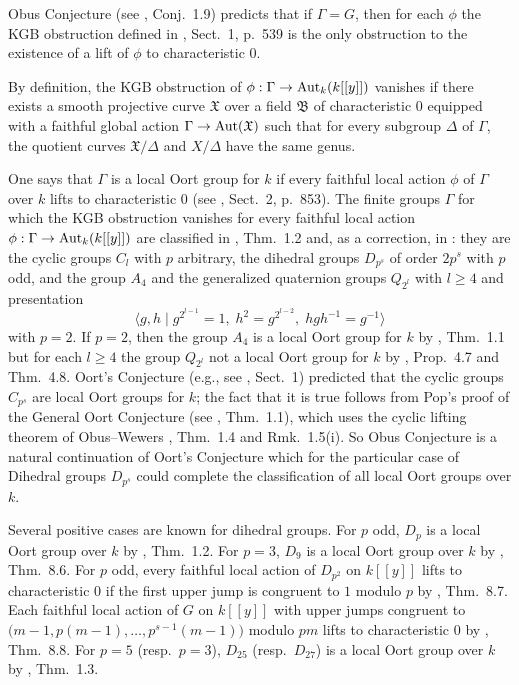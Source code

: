 \documentclass[11pt]{amsart}
\def\Aut{\textup{Aut}}
\begin{document}
Obus Conjecture (see \cite{O3}, Conj.\ 1.9) predicts that if $\Gamma=G$, then for each $\phi$ the KGB obstruction defined in \cite{CGH2}, Sect.\ 1, p.\ 539 is the only obstruction to the existence of a lift of $\phi$ to characteristic $0$. 

By definition, the KGB obstruction of $\phi:\Gamma\rightarrow\Aut_k(k[[y]])$ vanishes if there exists a smooth projective curve $\mathfrak X$ over a field $\mathfrak B$ of characteristic $0$ equipped with a faithful global action $\Gamma\rightarrow\Aut(\mathfrak X)$ such that for every subgroup $\Delta$ of $\Gamma$, the quotient curves $\mathfrak X/\Delta$ and $X/\Delta$ have the same genus.

One says that $\Gamma$ is a local Oort group for $k$ if every faithful local action $\phi$ of $\Gamma$ over $k$ lifts to characteristic $0$ (see \cite{CGH1}, Sect.\ 2, p.\ 853). The finite groups $\Gamma$ for which the KGB obstruction vanishes for every faithful local action $\phi:\Gamma\rightarrow\Aut_k(k[[y]])$ are classified in \cite{CGH2}, Thm.\ 1.2 and, as a correction, in \cite{CGH3}: they are the cyclic groups $C_l$ with $p$ arbitrary, the dihedral groups $D_{p^s}$ of order $2p^s$ with $p$ odd, and the group $A_4$ and the generalized quaternion groups $Q_{2^l}$ with $l\ge 4$ and presentation 
$$\langle g,h\mid g^{2^{l-1}}=1,\; h^2=g^{2^{l-2}},\; hgh^{-1}=g^{-1}\rangle$$ 
with $p=2$. If $p=2$, then the group $A_4$ is a local Oort group for $k$ by \cite{O2}, Thm.\ 1.1 but for each $l\ge 4$ the group $Q_{2^l}$ not a local Oort group for $k$ by \cite{BrW}, Prop.\ 4.7 and Thm.\ 4.8. Oort's Conjecture (e.g., see \cite{P}, Sect.\ 1) predicted that the cyclic groups $C_{p^s}$ are local Oort groups for $k$; the fact that it is true follows from Pop's proof of the General Oort Conjecture (see \cite{P}, Thm.\ 1.1), which uses the cyclic lifting theorem of Obus--Wewers \cite{OW}, Thm.\ 1.4 and Rmk.\ 1.5(i). So Obus Conjecture is a natural continuation of Oort's Conjecture which for the particular case of Dihedral groups $D_{p^s}$ could complete the classification of all local Oort groups over $k$. 

Several positive cases are known for dihedral groups. For $p$ odd, $D_p$ is a local Oort group over $k$ by \cite{BoW}, Thm.\ 1.2. For $p=3$, $D_9$ is a local Oort group over $k$ by \cite{O3}, Thm.\ 8.6. For $p$ odd, every faithful local action of $D_{p^2}$ on $k[[y]]$ lifts to characteristic $0$ if the first upper jump is congruent to $1$ modulo $p$ by \cite{O3}, Thm.\ 8.7. Each faithful local action of $G$ on $k[[y]]$ with upper jumps congruent to $\bigl(m-1,p(m-1),\ldots,p^{s-1}(m-1)\bigr)$ modulo $pm$ lifts to characteristic $0$ by \cite{O3}, Thm.\ 8.8. For $p=5$ (resp.\ $p=3$), $D_{25}$ (resp.\ $D_{27}$) is a local Oort group over $k$ by \cite{DDKOT}, Thm.\ 1.3.
\end{document}
